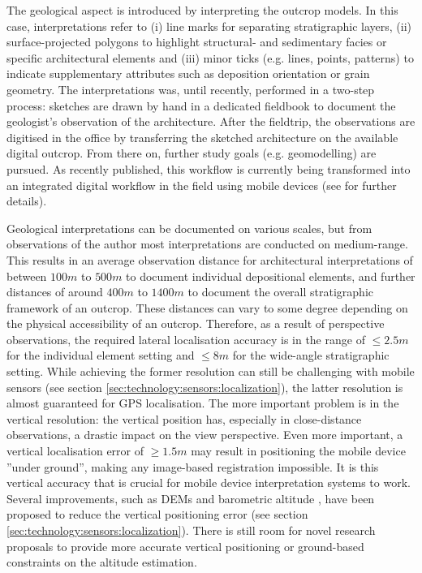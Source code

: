 \documentclass[review]{elsarticle}
\begin{document}
The geological aspect is introduced by interpreting the outcrop models. In this case, interpretations refer to (i) line marks for separating stratigraphic layers, (ii) surface-projected polygons to highlight structural- and sedimentary facies or specific architectural elements and (iii) minor ticks (e.g. lines, points, patterns) to indicate supplementary attributes such as deposition orientation or grain geometry. The interpretations was, until recently, performed in a two-step process: sketches are drawn by hand in a dedicated fieldbook to document the geologist's observation of the architecture. After the fieldtrip, the observations are digitised in the office by transferring the sketched architecture on the available digital outcrop. From there on, further study goals (e.g. geomodelling) are pursued. As recently published, this workflow is currently being transformed into an integrated digital workflow in the field using mobile devices (see \cite{Kehl2018_AGU} for further details).

Geological interpretations can be documented on various scales, but from observations of the author most interpretations are conducted on medium-range. This results in an average observation distance for architectural interpretations of between $100m$ to $500m$ to document individual depositional elements, and further distances of around $400m$ to $1400m$ to document the overall stratigraphic framework of an outcrop. These distances can vary to some degree depending on the physical accessibility of an outcrop. Therefore, as a result of perspective observations, the required lateral localisation accuracy is in the range of $\leq 2.5m$ for the individual element setting and $\leq 8m$ for the wide-angle stratigraphic setting. While achieving the former resolution can still be challenging with mobile sensors (see section \ref{sec:technology:sensors:localization}), the latter resolution is almost guaranteed for \gls{GPS} localisation. The more important problem is in the vertical resolution: the vertical position has, especially in close-distance observations, a drastic impact on the view perspective. Even more important, a vertical localisation error of  $\geq 1.5m$ may result in positioning the mobile device ''under ground'', making any image-based registration impossible. It is this vertical accuracy that is crucial for mobile device interpretation systems to work. Several improvements, such as \glspl{DEM} and barometric altitude \cite{Kehl2017_VGC}, have been proposed to reduce the vertical positioning error (see section \ref{sec:technology:sensors:localization}). There is still room for novel research proposals to provide more accurate vertical positioning or ground-based constraints on the altitude estimation.
\end{document}

